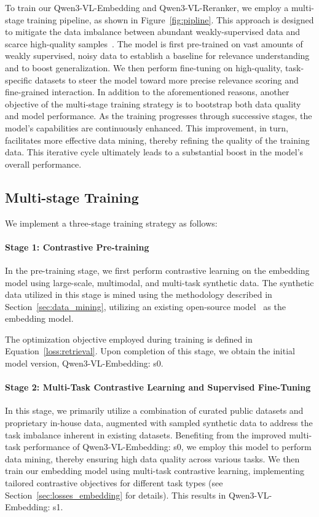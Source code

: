 \documentclass{article} %
\begin{document}
To train our Qwen3-VL-Embedding and Qwen3-VL-Reranker, we employ a multi-stage training pipeline, as shown in Figure~\ref{fig:pipline}. This approach is designed to mitigate the data imbalance between abundant weakly-supervised data and scarce high-quality samples~\citep{wang2022text, li2023towards, chen-etal-2024-m3, qwen3embedding}. 
The model is first pre-trained on vast amounts of weakly supervised, noisy data to establish a baseline for relevance understanding and to boost generalization. We then perform fine-tuning on high-quality, task-specific datasets to steer the model toward more precise relevance scoring and fine-grained interaction. 
In addition to the aforementioned reasons, another objective of the multi-stage training strategy is to bootstrap both data quality and model performance. As the training progresses through successive stages, the model's capabilities are continuously enhanced. This improvement, in turn, facilitates more effective data mining, thereby refining the quality of the training data. This iterative cycle ultimately leads to a substantial boost in the model's overall performance.

\subsection{Multi-stage Training}

We implement a three-stage training strategy as follows:

\paragraph{Stage 1: Contrastive Pre-training}\label{sec:stage1} 
In the pre-training stage, we first perform contrastive learning on the embedding model using large-scale, multimodal, and multi-task synthetic data. 
The synthetic data utilized in this stage is mined using the methodology described in Section~\ref{sec:data_mining}, utilizing an existing open-source model~\citep{zhang2025bridging} as the embedding model.

The optimization objective employed during training is defined in Equation~\ref{loss:retrieval}. Upon completion of this stage, we obtain the initial model version, Qwen3-VL-Embedding: s0.

\paragraph{Stage 2: Multi-Task Contrastive Learning and Supervised Fine-Tuning}\label{sec:stage2}
In this stage, we primarily utilize a combination of curated public datasets and proprietary in-house data, augmented with sampled synthetic data to address the task imbalance inherent in existing datasets. Benefiting from the improved multi-task performance of Qwen3-VL-Embedding: s0, we employ this model to perform data mining, thereby ensuring high data quality across various tasks. We then train our embedding model using multi-task contrastive learning, implementing tailored contrastive objectives for different task types (see Section~\ref{sec:losses_embedding} for details). This results in Qwen3-VL-Embedding: s1.
\end{document}
